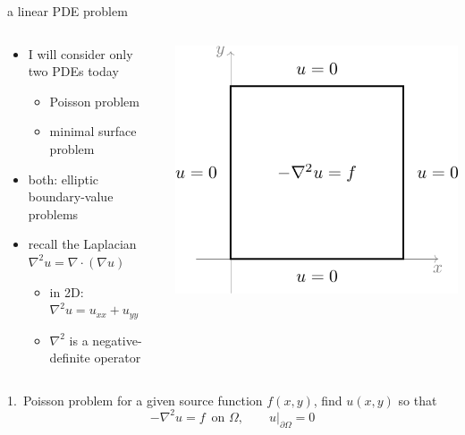 \documentclass[10pt,
               svgnames,
               hyperref={colorlinks,citecolor=DeepPink4,linkcolor=FireBrick,urlcolor=Maroon},
               usepdftitle=false]{beamer}
\newcommand{\grad}{\nabla}
\newcommand{\Div}{\nabla \cdot}
\begin{document}
\begin{frame}{a linear PDE problem}
\begin{columns}
\begin{column}{0.6\textwidth}
\begin{itemize}
\item I will consider only two PDEs today
    \begin{itemize}
    \item[1.] Poisson problem
    \item[2.] minimal surface problem
    \end{itemize}
\item both: elliptic boundary-value problems
\item recall the Laplacian $\grad^2 u =\Div(\grad u)$
    \begin{itemize}
    \item[$\circ$] in 2D: \quad $\grad^2 u = u_{xx} + u_{yy}$
    \item[$\circ$] $\grad^2$ is a negative-definite operator
    \end{itemize}
\end{itemize}
\end{column}
\begin{column}{0.4\textwidth}
\hfill \includegraphics[width=\textwidth]{images/poisson.png}
\end{column}
\end{columns}

\bigskip
\begin{block}{1.~Poisson problem} for a given source function $f(x,y)$, find $u(x,y)$ so that
    $$-\grad^2 u = f \, \text{ on } \Omega, \qquad u\big|_{\partial \Omega} = 0$$
\end{block}
\end{frame}
\end{document}
